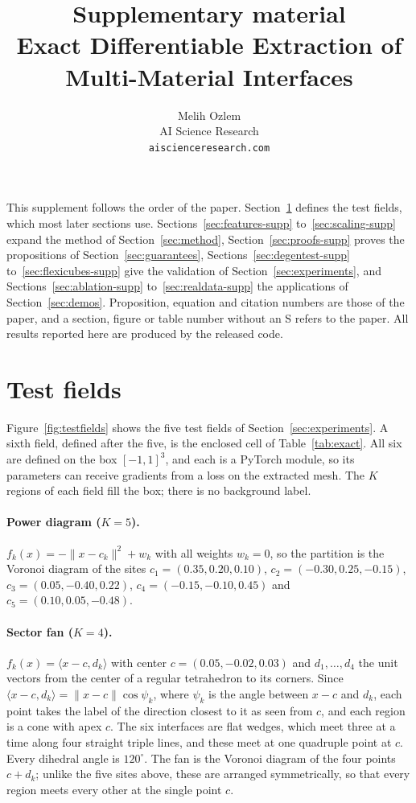 \documentclass[11pt]{article}
\title{\textbf{Supplementary material}\\[4pt]
\large Exact Differentiable Extraction of Multi-Material Interfaces}
\author{Melih Ozlem\\ AI Science Research\\ \texttt{aiscienceresearch.com}}
\date{}
\theoremstyle{definition}
\begin{document}
\maketitle

\noindent This supplement follows the order of the paper.
Section~\ref{sec:fields-supp} defines the test fields, which most later
sections use. Sections~\ref{sec:features-supp} to~\ref{sec:scaling-supp}
expand the method of Section~\ref{sec:method},
Section~\ref{sec:proofs-supp} proves the propositions of
Section~\ref{sec:guarantees}, Sections~\ref{sec:degentest-supp}
to~\ref{sec:flexicubes-supp} give the validation of
Section~\ref{sec:experiments}, and Sections~\ref{sec:ablation-supp}
to~\ref{sec:realdata-supp} the applications of Section~\ref{sec:demos}.
Proposition, equation and citation numbers are those of the paper, and a
section, figure or table number without an S refers to the paper. All results reported here
are produced by the released code.

\section{Test fields}
\label{sec:fields-supp}

Figure~\ref{fig:testfields} shows the five test fields of
Section~\ref{sec:experiments}. A sixth field, defined after the five, is the
enclosed cell of Table~\ref{tab:exact}. All six are defined on the box
$[-1,1]^3$, and each is a PyTorch module, so its parameters can receive
gradients from a loss on the extracted mesh. The $K$ regions of each field
fill the box; there is no background label.

\paragraph{Power diagram ($K=5$).} $f_k(x) = -\lVert x - c_k\rVert^2 + w_k$
with all weights $w_k = 0$, so the partition is the Voronoi diagram of the
sites $c_1 = (0.35, 0.20, 0.10)$, $c_2 = (-0.30, 0.25, -0.15)$,
$c_3 = (0.05, -0.40, 0.22)$, $c_4 = (-0.15, -0.10, 0.45)$ and
$c_5 = (0.10, 0.05, -0.48)$.

\paragraph{Sector fan ($K=4$).} $f_k(x) = \langle x - c, d_k\rangle$ with
center $c = (0.05, -0.02, 0.03)$ and $d_1,\dots,d_4$ the unit vectors from the
center of a regular tetrahedron to its corners. Since
$\langle x - c, d_k\rangle = \lVert x - c\rVert \cos\psi_k$, where $\psi_k$
is the angle between $x - c$ and $d_k$, each point takes the label of the
direction closest to it as seen from $c$, and each region is a cone with apex
$c$. The six interfaces are flat
wedges, which meet three at a time along four straight triple lines, and these
meet at one quadruple point at $c$. Every dihedral angle is $120^\circ$. The fan is
the Voronoi diagram of the four points $c + d_k$; unlike the five sites above,
these are arranged symmetrically, so that every region meets every other at
the single point $c$.
\end{document}

